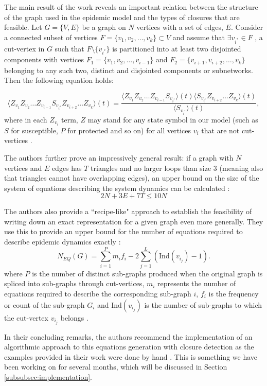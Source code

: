 \documentclass[../report.tex]{subfiles}
\begin{document}
The main result of the work reveals an important relation between the structure of the graph used in the epidemic model and the types of closures that are feasible. Let $G = \{V, E\}$ be a graph on $N$ vertices with a set of edges, $E$. Consider a connected subset of vertices $F = \{v_1, v_2, \dots, v_k\} \subset V$ and assume that $\exists v_{i^*} \in F$ , a cut-vertex in $G$ such that $F \setminus \{ v_{i^*} \}$ is partitioned into at least two disjointed components with vertices $F_1 = \{ v_1, v_2, \dots, v_{i-1} \}$ and $F_2 = \{ v_{i+1}, v_{i+2}, \dots, v_k \}$ belonging to any such two, distinct and disjointed components or subnetworks. Then the following equation holds:

$$
\langle Z_{v_1} Z_{v_2} \dots Z_{v_{i-1}} S_{v_{i^*}} Z_{v_{i+2}} \dots Z_{v_k} \rangle (t) = \frac{\langle Z_{v_1} Z_{v_2} \dots Z_{v_{i-1}} S_{v_{i^*}} \rangle (t) \langle S_{v_{i^*}} Z_{v_{i+2}} \dots Z_{v_k} \rangle (t)}{\langle S_{v_{i^*}} \rangle (t)},
$$
where in each $Z_{v_i}$ term, $Z$ may stand for any state symbol in our model (such as $S$ for susceptible, $P$ for protected and so on) for all vertices $v_i$ that are not cut-vertices \cite{kiss_2014}.

The authors further prove an impressively general result: if a graph with $N$ vertices and  $E$ edges has $T$ triangles and no larger loops than size 3 (meaning also that triangles cannot have overlapping edges), an upper bound on the size of the system of equations describing the system dynamics can be calculated \cite{kiss_2014}:
$$
2N + 3E + 7T \leq 10N
$$

The authors also provide a ``recipe-like" approach to establish the feasibility of writing down an exact representation for a given graph even more generally. They use this to provide an upper bound for the number of equations required to describe epidemic dynamics exactly \cite{kiss_2014}:
$$
\displaystyle N_{EQ}(G)=\sum^P_{i=1}m_if_i - 2\sum^{L}_{j=1}(\text{Ind}(v_{i_j})-1).
$$
where $P$ is the number of distinct sub-graphs produced when the original graph is spliced into sub-graphs through cut-vertices, $m_i$ represents the number of equations required to describe the corresponding sub-graph $i$, $f_i$ is the frequency or count of the sub-graph $G_i$ and $\text{Ind}(v_{i_j})$ is the number of sub-graphs to which the cut-vertex $v_{i_j}$ belongs \cite{kiss_2014}.

In their concluding remarks, the authors recommend the implementation of an algorithmic approach to this equations generation with closure detection as the examples provided in their work were done by hand \cite{kiss_2014}. This is something we have been working on for several months, which will be discussed in Section \ref{subsubsec:implementation}. 
\end{document}
